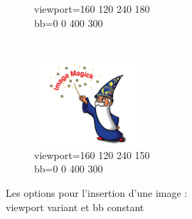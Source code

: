 \documentclass[french]{article}
\begin{document}
\begin{figure}[h]
\begin{subfigure}[b]{0.3\textwidth}
        \caption{viewport=160 120 240 180\\bb=0 0 400 300}%
        \label{essai_h}
    \end{subfigure}
    ~
    \begin{subfigure}[b]{0.3\textwidth}
        \includegraphics[viewport=160 120 240 150,bb=0 0 400 300,width=4cm,height=3cm,clip=true]{test.jpg}
        \caption{viewport=160 120 240 150\\bb=0 0 400 300}%
        \label{essai_i}
    \end{subfigure}
    \caption{Les options pour l'insertion d'une image :\\viewport variant et bb constant}%
    \label{viewport variant et bb constant}

\end{figure}
\end{document}
